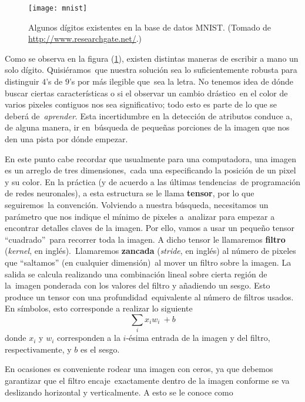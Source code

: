\begin{figure}
  \centering
  \texttt{[image: mnist]}
  \caption{Algunos dígitos existentes en la base de datos MNIST.
    (Tomado de \url{http://www.researchgate.net/}.)}
  \label{mnist_fig}
\end{figure}

Como se observa en la figura (\ref{mnist_fig}), existen distintas maneras de escribir a mano un solo dígito. Quisiéramos\
que nuestra solución sea lo suficientemente robusta para distinguir $4$'s de $9$'s por más ilegible que\
sea la letra. No tenemos idea de dónde buscar ciertas características o si el observar un cambio drástico\
en el color de varios pixeles contiguos nos sea significativo; todo esto es parte de lo que se deberá de\
\emph{aprender}. Esta incertidumbre en la detección de atributos conduce a, de alguna manera, ir en\
búsqueda de pequeñas porciones de la imagen que nos den una pista por dónde empezar.\par
En este punto cabe recordar que usualmente para una computadora, una imagen es un arreglo de tres dimensiones,\
cada una especificando la posición de un pixel y su color. En la práctica (y de acuerdo a las últimas tendencias\
de programación de redes neuronales), a esta estructura se le llama \textbf{tensor}, por lo que seguiremos\
la convención. Volviendo a nuestra búsqueda, necesitamos un parámetro que nos indique el mínimo de pixeles a\
analizar para empezar a encontrar detalles claves de la imagen. Por ello, vamos a usar un pequeño tensor ``cuadrado''\
para recorrer toda la imagen. A dicho tensor le llamaremos \textbf{filtro} (\emph{kernel}, en inglés).\
Llamaremos \textbf{zancada} (\emph{stride}, en inglés) al número de pixeles que ``saltamos'' (en cualquier dimensión)\
al mover un filtro sobre la imagen. La salida se calcula realizando una combinación lineal sobre cierta región de la\
imagen ponderada con los valores del filtro y añadiendo un sesgo. Esto produce un tensor con una profundidad\
equivalente al número de filtros usados. En símbolos, esto corresponde a realizar lo siguiente
\begin{equation} \label{entry-wise-sum}
  \sum _{i} x_i w_i\ + b
\end{equation}
donde $x_i$ y $w_i$ corresponden a la $i$-ésima entrada de la imagen y del filtro, respectivamente, y $b$ es el sesgo.\par
En ocasiones es conveniente rodear una imagen con ceros, ya que debemos garantizar que el filtro encaje\
exactamente dentro de la imagen conforme se va deslizando horizontal y verticalmente. A esto se le conoce como\
